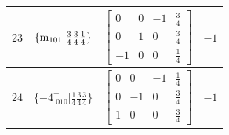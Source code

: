 \documentclass[fleqn,8pt]{jsarticle}
\begin{document}
\begin{longtable}{cccc}
$ 23 $ & $ \{{\rm m}_{101}|\frac{3}{4} \frac{3}{4} \frac{1}{4}\} $ & $ \begin{bmatrix} 0 & 0 & -1 & \frac{3}{4} \\ 0 & 1 & 0 & \frac{3}{4} \\ -1 & 0 & 0 & \frac{1}{4} \end{bmatrix} $ & $ -1 $ \\ \hline
$ 24 $ & $ \{-4^{+}_{\,\,010}|\frac{1}{4} \frac{3}{4} \frac{3}{4}\} $ & $ \begin{bmatrix} 0 & 0 & -1 & \frac{1}{4} \\ 0 & -1 & 0 & \frac{3}{4} \\ 1 & 0 & 0 & \frac{3}{4} \end{bmatrix} $ & $ -1 $ \\
\end{longtable}
\end{document}
